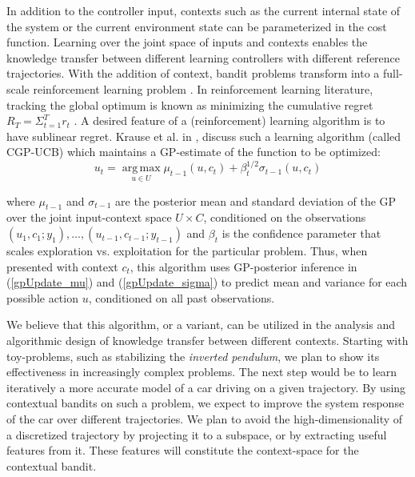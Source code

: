 \documentclass[10pt,a4paper]{article}
\begin{document}
In addition to the controller input, contexts such as the current internal state of the system or the current environment state can be parameterized in the cost function. %
Learning over the joint space of inputs and contexts enables the knowledge transfer between different learning controllers with different reference trajectories.
With the addition of context, bandit problems transform into a full-scale reinforcement learning problem \cite{sutton98a}. In reinforcement learning literature, tracking the global optimum is known as minimizing the cumulative regret
$R_{T} = \Sigma_{t = 1}^{T}r_{t} $ . A desired feature of a (reinforcement) learning algorithm is to have sublinear regret. Krause et al. in \cite{Krause2}, discuss such a learning algorithm (called CGP-UCB) which maintains a GP-estimate of the function to be optimized: 
\begin{equation}
u_{t} = \operatorname*{arg\,max}_{u \in U}\mu_{t-1}(u,c_t) + \beta_{t}^{1/2}\sigma_{t-1}(u,c_t) \nonumber
\end{equation}

where $\mu_{t-1}$ and $\sigma_{t-1}$ are the posterior mean and standard deviation of the GP over the joint input-context
space $U \times C$, conditioned on the observations $(u_1,c_1; y_1),\ldots,(u_{t-1},c_{t-1}; y_{t-1})$ and $\beta_{t}$ is the confidence parameter that scales exploration vs. exploitation for the particular problem. Thus, when presented with context $c_t$, this algorithm uses GP-posterior inference in (\ref{gpUpdate_mu}) and (\ref{gpUpdate_sigma}) to predict mean and variance for each possible action $u$, conditioned on all past observations.

We believe that this algorithm, or a variant, can be utilized in the analysis and algorithmic design of knowledge transfer between different contexts. Starting with toy-problems, such as stabilizing the \emph{inverted pendulum}, we plan to show its effectiveness in increasingly complex problems. The next step would be to learn iteratively a more accurate model of a car driving on a given trajectory. By using contextual bandits on such a problem, we expect to improve the system response of the car over different trajectories. We plan to avoid the high-dimensionality of a discretized trajectory by projecting it to a subspace, or by extracting useful features from it. These features will constitute the context-space for the contextual bandit.
\end{document}
